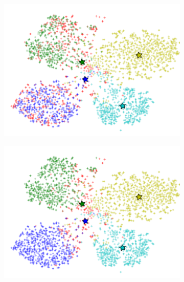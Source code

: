\begin{figure}[t]
\begin{subfigure}[b]{0.27\linewidth}
    \includegraphics[width=\linewidth]{images/knn}
    \caption{}
\label{fig:knn}
  \end{subfigure}
%
  \begin{subfigure}[b]{0.27\linewidth}
    \includegraphics[width=\linewidth]{images/kmeans}
    \caption{}
\label{fig:kmeans}
  \end{subfigure}
%
  \begin{subfigure}[b]{0.27\linewidth}

\end{subfigure}
\end{figure}

